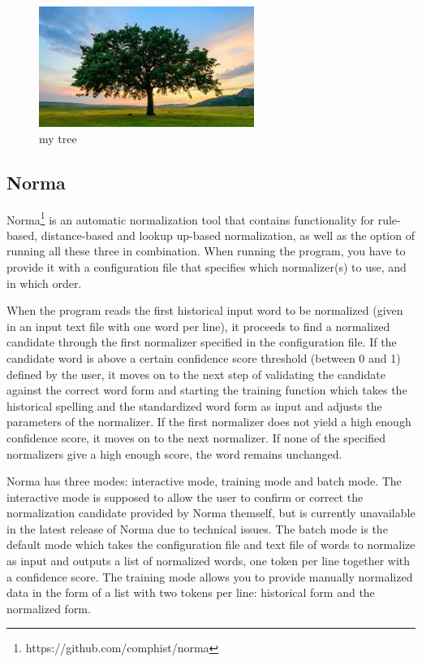 \documentclass[11pt,a4paper]{article}
\begin{document}
\begin{figure}[H]
    \centering
    \includegraphics[width=7cm]{images/tree.jpg}
    \caption{my tree}
    \label{fig:mytree}
\end{figure}

\subsection{Norma} 

Norma\footnote{https://github.com/comphist/norma} \citep{bollmann:12} is an automatic normalization tool that contains functionality for rule-based, distance-based and lookup up-based normalization, as well as the option of running all these three in combination. When running the program, you have to provide it with a configuration file that specifies which normalizer(s) to use, and in which order. 

When the program reads the first historical input word to be normalized (given in an input text file with one word per line), it proceeds to find a normalized candidate through the first normalizer specified in the configuration file. If the candidate word is above a certain confidence score threshold (between 0 and 1) defined by the user, it moves on to the next step of validating the candidate against the correct word form and starting the training function which takes the historical spelling and the standardized word form as input and adjusts the parameters of the normalizer. If the first normalizer does not yield a high enough confidence score, it moves on to the next normalizer. If none of the specified normalizers give a high enough score, the word remains unchanged.         

Norma has three modes: interactive mode, training mode and batch mode. The interactive mode is supposed to allow the user to confirm or correct the normalization candidate provided by Norma themself, but is currently unavailable in the latest release of Norma due to technical issues. The batch mode is the default mode which takes the configuration file and text file of words to normalize as input and outputs a list of normalized words, one token per line together with a confidence score. The training mode allows you to provide manually normalized data in the form of a list with two tokens per line: historical form and the normalized form. 
\end{document}
